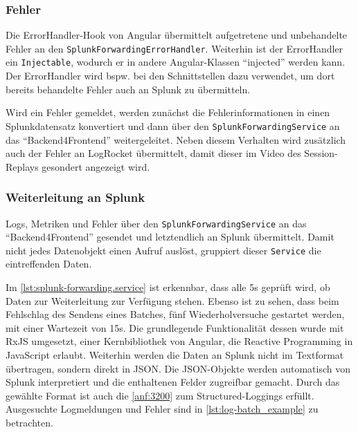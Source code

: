 \subsubsection{Fehler}

Die ErrorHandler-Hook von Angular übermittelt aufgetretene und unbehandelte Fehler an den \texttt{SplunkForwardingErrorHandler}. Weiterhin ist der ErrorHandler ein \texttt{Injectable}, wodurch er in andere Angular-Klassen \enquote{injected} werden kann. Der ErrorHandler wird bspw. bei den Schnittstellen dazu verwendet, um dort bereits behandelte Fehler auch an Splunk zu übermitteln.

Wird ein Fehler gemeldet, werden zunächst die Fehlerinformationen in einen Splunkdatensatz konvertiert und dann über den \texttt{SplunkForwardingService} an das \enquote{Backend4Frontend} weitergeleitet. Neben diesem Verhalten wird zusätzlich auch der Fehler an LogRocket übermittelt, damit dieser im Video des Session-Replays gesondert angezeigt wird.



\subsubsection{Weiterleitung an Splunk}
\label{subsec:weiterleitung-an-splunk}

Logs, Metriken und Fehler über den  \texttt{SplunkForwardingService} an das \enquote{Backend4Frontend} gesendet und letztendlich an Splunk übermittelt. Damit nicht jedes Datenobjekt einen Aufruf auslöst, gruppiert dieser \texttt{Service} die eintreffenden Daten.

Im \autoref{lst:splunk-forwarding.service} ist erkennbar, dass alle 5s geprüft wird, ob Daten zur Weiterleitung zur Verfügung stehen. Ebenso ist zu sehen, dass beim Fehlschlag des Sendens eines Batches, fünf Wiederholversuche gestartet werden, mit einer Wartezeit von 15s. Die grundlegende Funktionalität dessen wurde mit RxJS \cite{RxJS} umgesetzt, einer Kernbibliothek von Angular, die Reactive Programming \cite{ReactiveProgramming} in JavaScript erlaubt. Weiterhin werden die Daten an Splunk nicht im Textformat übertragen, sondern direkt in JSON. Die JSON-Objekte werden automatisch von Splunk interpretiert und die enthaltenen Felder zugreifbar gemacht. Durch das gewählte Format \cite{StructuredAndInteroperableLogging} ist auch die \autoref{anf:3200} zum Structured-Loggings erfüllt. Ausgesuchte Logmeldungen und Fehler sind in \autoref{lst:log-batch_example} zu betrachten.


